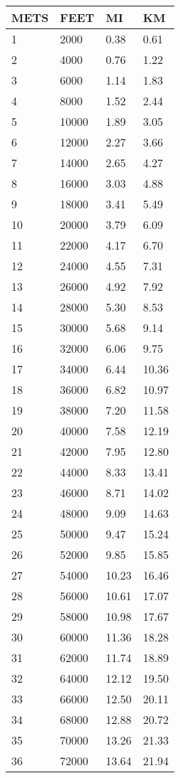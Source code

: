 \documentclass{article}
\begin{document}
\begin{longtable}{@{}l l l l}
\small
\textbf{METS} & \textbf{FEET} & \textbf{MI} & \textbf{KM}\\
\endhead
1 & 2000 & 0.38 & 0.61\\
2 & 4000 & 0.76 & 1.22\\
3 & 6000 & 1.14 & 1.83\\
4 & 8000 & 1.52 & 2.44\\
5 & 10000 & 1.89 & 3.05\\
6 & 12000 & 2.27 & 3.66\\
7 & 14000 & 2.65 & 4.27\\
8 & 16000 & 3.03 & 4.88\\
9 & 18000 & 3.41 & 5.49\\
10 & 20000 & 3.79 & 6.09\\
11 & 22000 & 4.17 & 6.70\\
12 & 24000 & 4.55 & 7.31\\
13 & 26000 & 4.92 & 7.92\\
14 & 28000 & 5.30 & 8.53\\
15 & 30000 & 5.68 & 9.14\\
16 & 32000 & 6.06 & 9.75\\
17 & 34000 & 6.44 & 10.36\\
18 & 36000 & 6.82 & 10.97\\
19 & 38000 & 7.20 & 11.58\\
20 & 40000 & 7.58 & 12.19\\
21 & 42000 & 7.95 & 12.80\\
22 & 44000 & 8.33 & 13.41\\
23 & 46000 & 8.71 & 14.02\\
24 & 48000 & 9.09 & 14.63\\
25 & 50000 & 9.47 & 15.24\\
26 & 52000 & 9.85 & 15.85\\
27 & 54000 & 10.23 & 16.46\\
28 & 56000 & 10.61 & 17.07\\
29 & 58000 & 10.98 & 17.67\\
30 & 60000 & 11.36 & 18.28\\
31 & 62000 & 11.74 & 18.89\\
32 & 64000 & 12.12 & 19.50\\
33 & 66000 & 12.50 & 20.11\\
34 & 68000 & 12.88 & 20.72\\
35 & 70000 & 13.26 & 21.33\\
36 & 72000 & 13.64 & 21.94\\

\end{longtable}
\end{document}
